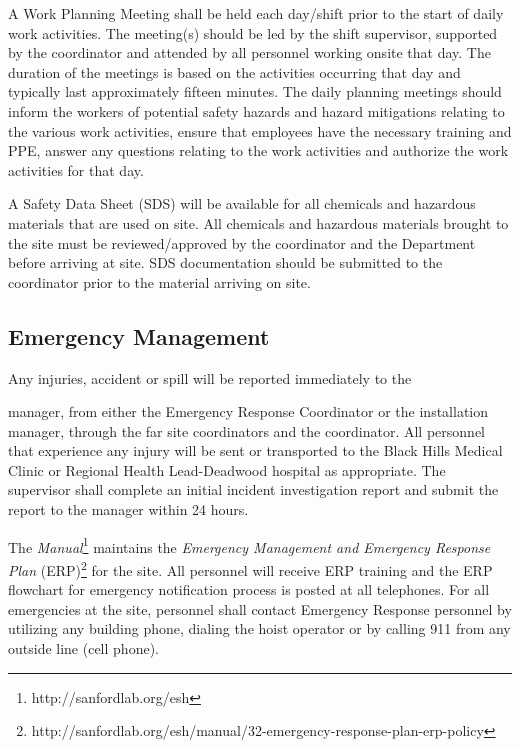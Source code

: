 A Work Planning Meeting shall be held each day/shift prior to the
start of daily work activities. The meeting(s) should be led by the
shift supervisor, supported by the   coordinator and
attended by all personnel working onsite that day. The duration of
the meetings is based on the activities occurring that day and
typically last approximately fifteen minutes. The daily planning
meetings should inform the workers of potential safety hazards and
hazard mitigations relating to the various work activities, ensure
that employees have the necessary  training and PPE, answer any
questions relating to the work activities and authorize the work
activities for that day.

A Safety Data Sheet (SDS) will be available for all chemicals and
hazardous materials that are used on site. All chemicals and hazardous
materials brought to the  site must be reviewed/approved by the
  coordinator and the  
Department before arriving at site.  SDS documentation should be
submitted to the   coordinator prior to the
material arriving on site.

\subsection{Emergency Management}

Any injuries, accident or spill will be reported immediately to the

  manager, from either the  Emergency
Response Coordinator or the installation manager, through the  far site
 coordinators and the   coordinator. All personnel that
experience any injury will be sent or transported to the Black Hills
Medical Clinic or Regional Health Lead-Deadwood hospital as
appropriate.  The supervisor shall complete an initial incident
investigation report and submit the report to the 
 manager within 24 hours.


The {\it {} 
Manual}\footnote{http://sanfordlab.org/esh} maintains the {\it Emergency
Management and Emergency Response Plan}
(ERP)\footnote{http://sanfordlab.org/esh/manual/32-emergency-response-plan-erp-policy}
for the site. All personnel will receive ERP training and the ERP
flowchart for emergency notification process is posted at all
telephones. For all emergencies at the  site, personnel
shall contact Emergency Response personnel by utilizing any building
phone, dialing the hoist operator or by calling 911 from any outside
line (cell phone).

